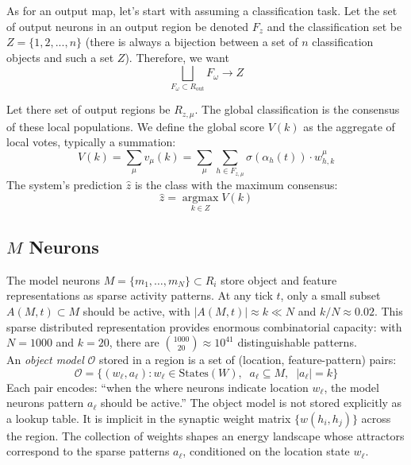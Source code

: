 \documentclass[11pt]{article}
\begin{document}
As for an output map, let's start with assuming a classification task. Let the set of output neurons in an output region be denoted $F_z$ and the classification set be $Z = \{1,2,...,n\}$ (there is always a bijection between a set of $n$ classification objects and such a set $Z$). Therefore, we want 
\begin{equation}
    \bigsqcup_{F_\omega \subset R_{\mathrm{out}}} F_{\omega} \to Z 
\end{equation}

Let there set of output regions be $R_{z,\mu}$. The global classification is the consensus of these local populations. We define the global score $V(k)$ as the aggregate of local votes, typically a summation:
\begin{equation}
V(k) = \sum_{\mu} v_\mu(k) = \sum_{\mu} \sum_{h \in F_{z, \mu}} \sigma(\alpha_h(t)) \cdot w_{h, k}^\mu
\end{equation}
The system's prediction $\hat{z}$ is the class with the maximum consensus:
\begin{equation}
\hat{z} = \operatorname*{argmax}_{k \in Z} V(k)
\end{equation}



\subsection{$M$ Neurons}\label{subsec:m_neurons}
The model neurons $M = \{m_1, \ldots, m_N\} \subset R_i$ store object and feature representations as sparse activity patterns. At any tick $t$, only a small subset $A(M, t) \subset M$ should be active, with $|A(M,t)| \approx k \ll N$ and $k/N \approx 0.02$. This sparse distributed representation provides enormous combinatorial capacity: with $N = 1000$ and $k = 20$, there are $\binom{1000}{20} \approx 10^{41}$ distinguishable patterns.\\

An \textit{object model} $\mathcal{O}$ stored in a region is a set of (location, feature-pattern) pairs:
\begin{equation}
    \mathcal{O} = \{(w_\ell, a_\ell) : w_\ell \in \mathrm{States}(W),\;\; a_\ell \subseteq M,\;\; |a_\ell| = k \}
\end{equation}
Each pair encodes: ``when the where neurons indicate location $w_\ell$, the model neurons pattern $a_\ell$ should be active.'' The object model is not stored explicitly as a lookup table. It is implicit in the synaptic weight matrix $\{w(h_i, h_j)\}$ across the region. The collection of weights shapes an energy landscape whose attractors correspond to the sparse patterns $a_\ell$, conditioned on the location state $w_\ell$.
\end{document}
